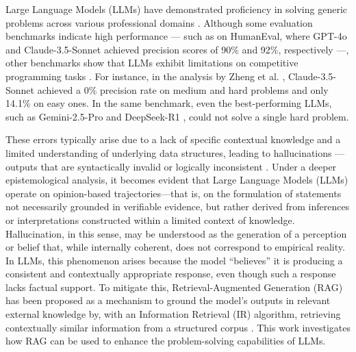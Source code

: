 \documentclass[preprint,12pt]{elsarticle}
\begin{document}
Large Language Models (LLMs) have demonstrated proficiency in solving generic problems across various professional domains \cite{LLMCodeGeneration, jimenez2024swebenchlanguagemodelsresolve, PerformanceLLMLeetCode}. Although some evaluation benchmarks indicate high performance --- such as on HumanEval, where GPT-4o \cite{openai2024gpt4ocard} and Claude-3.5-Sonnet \cite{anthropic2024claude35sonnet} achieved precision scores of 90\% and 92\%, respectively \cite{yu2024humanevalprombpppro} ---, other benchmarks show that LLMs exhibit limitations on competitive programming tasks \cite{chen2021evaluatinglargelanguagemodels, zheng2025livecodebenchproolympiadmedalists, hossain2025llmprosanalyzinglargelanguage, BenchmarkLeetcode}. For instance, in the analysis by Zheng et al. \cite{zheng2025livecodebenchproolympiadmedalists}, Claude-3.5-Sonnet achieved a 0\% precision rate on medium and hard problems and only 14.1\% on easy ones. In the same benchmark, even the best-performing LLMs, such as Gemini-2.5-Pro \cite{deepmind2025gemini25pro} and DeepSeek-R1 \cite{deepseekai2025deepseekr1incentivizingreasoningcapability}, could not solve a single hard problem.

These errors typically arise due to a lack of specific contextual knowledge and a limited understanding of underlying data structures, leading to hallucinations --- outputs that are syntactically invalid or logically inconsistent \cite{hallucination}. %
Under a deeper epistemological analysis, it becomes evident that Large Language Models (LLMs) operate on opinion-based trajectories—that is, on the formulation of statements not necessarily grounded in verifiable evidence, but rather derived from inferences or interpretations constructed within a limited context of knowledge. Hallucination, in this sense, may be understood as the generation of a perception or belief that, while internally coherent, does not correspond to empirical reality. In LLMs, this phenomenon arises because the model ``believes” it is producing a consistent and contextually appropriate response, even though such a response lacks factual support.%
To mitigate this, Retrieval-Augmented Generation (RAG) \cite{RAGIntroduction, gao2023retrieval} has been proposed as a mechanism to ground the model’s outputs in relevant external knowledge by, with an Information Retrieval (IR) algorithm, retrieving contextually similar information from a structured corpus \cite{RAGIntroduction, gao2023retrieval}. This work investigates how RAG can be used to enhance the problem-solving capabilities of LLMs.
\end{document}
